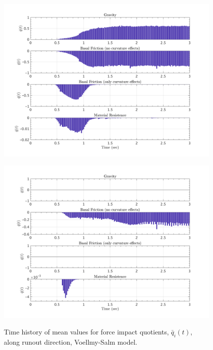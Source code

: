 \documentclass{article}
\begin{document}
\begin{figure}[H]
        \begin{minipage}[b]{0.5\linewidth}
                \centering
                \includegraphics[width=1\textwidth]{InclinedPlane/LocalRecords/ContribF15_V_x.png}
                \label{fig:Ramp-Vx3}
        \end{minipage}
        \begin{minipage}[b]{0.5\linewidth}
                \centering
                \includegraphics[width=1\textwidth]{InclinedPlane/LocalRecords/ContribF17_V_x.png}
                \label{fig:Ramp-Vx4}
        \end{minipage}
        \caption{Time history of mean values for force impact quotients, $\bar{q}_i(t)$, along runout direction, Voellmy-Salm model.}
        \label{fig:Ramp-Vx}
\end{figure}
\end{document}
